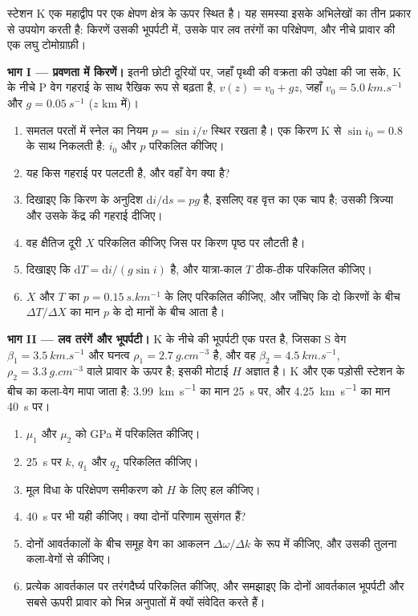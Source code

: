 \begin{problem}[{सप्ताहांत समस्या --- किरणें, लव तरंगें और लघु
टोमोग्राफ़ी, एक काल्पनिक स्टेशन के नीचे}]
\label{pb:b3:seismology-imaging:1}
स्टेशन K एक महाद्वीप पर एक क्षेपण क्षेत्र के ऊपर स्थित है। यह समस्या इसके अभिलेखों का
तीन प्रकार से उपयोग करती है: किरणें उसकी भूपर्पटी में, उसके पार लव तरंगों का परिक्षेपण,
और नीचे प्रावार की एक लघु टोमोग्राफ़ी।

\medskip
\noindent\textbf{भाग I --- प्रवणता में किरणें।} इतनी छोटी दूरियों पर, जहाँ पृथ्वी की वक्रता की
उपेक्षा की जा सके, K के नीचे P वेग गहराई के साथ रैखिक रूप से बढ़ता है,
$v(z) = v_0 + gz$, जहाँ $v_0 = \qty{5.0}{km.s^{-1}}$ और
$g = \qty{0.05}{s^{-1}}$ ($z$ km में)।
\begin{enumerate}
  \item समतल परतों में स्नेल का नियम $p = \sin i/v$ स्थिर रखता है। एक किरण K से
        $\sin i_0 = 0.8$ के साथ निकलती है: $i_0$ और $p$ परिकलित कीजिए।
  \item यह किस गहराई पर पलटती है, और वहाँ वेग क्या है?
  \item दिखाइए कि किरण के अनुदिश $\mathrm di/\mathrm ds = pg$ है, इसलिए वह
        वृत्त का एक चाप है; उसकी त्रिज्या और उसके केंद्र की गहराई दीजिए।
  \item वह क्षैतिज दूरी $X$ परिकलित कीजिए जिस पर किरण
        पृष्ठ पर लौटती है।
  \item दिखाइए कि $\mathrm dT = \mathrm di/(g\sin i)$ है, और यात्रा-काल
        $T$ ठीक-ठीक परिकलित कीजिए।
  \item $X$ और $T$ का $p = \qty{0.15}{s.km^{-1}}$ के लिए परिकलित कीजिए, और जाँचिए कि
        दो किरणों के बीच $\Delta T/\Delta X$ का मान
        $p$ के दो मानों के बीच आता है।
\end{enumerate}

\noindent\textbf{भाग II --- लव तरंगें और भूपर्पटी।} K के नीचे की भूपर्पटी एक
परत है, जिसका S वेग $\beta_1 = \qty{3.5}{km.s^{-1}}$ और घनत्व
$\rho_1 = \qty{2.7}{g.cm^{-3}}$ है, और वह $\beta_2 =
\qty{4.5}{km.s^{-1}}$, $\rho_2 = \qty{3.3}{g.cm^{-3}}$ वाले प्रावार के ऊपर है; इसकी मोटाई $H$
अज्ञात है। K और एक पड़ोसी स्टेशन के बीच  का कला-वेग
मापा जाता है: \qty{3.99}{km.s^{-1}} का मान \qty{25}{s} पर, और \qty{4.25}{km.s^{-1}} का मान
\qty{40}{s} पर।
\begin{enumerate}[resume]
  \item $\mu_1$ और $\mu_2$ को \unit{GPa} में परिकलित कीजिए।
  \item \qty{25}{s} पर $k$, $q_1$ और $q_2$ परिकलित कीजिए।
  \item मूल विधा के परिक्षेपण समीकरण को $H$ के लिए हल कीजिए।
  \item \qty{40}{s} पर भी यही कीजिए। क्या दोनों परिणाम सुसंगत हैं?
  \item दोनों आवर्तकालों के बीच समूह वेग का आकलन
        $\Delta\omega/\Delta k$ के रूप में कीजिए, और उसकी तुलना कला-वेगों से कीजिए।
  \item प्रत्येक आवर्तकाल पर तरंगदैर्घ्य परिकलित कीजिए, और समझाइए कि
        दोनों आवर्तकाल भूपर्पटी और सबसे ऊपरी प्रावार को भिन्न अनुपातों में
        क्यों संवेदित करते हैं।
\end{enumerate}


\end{problem}
